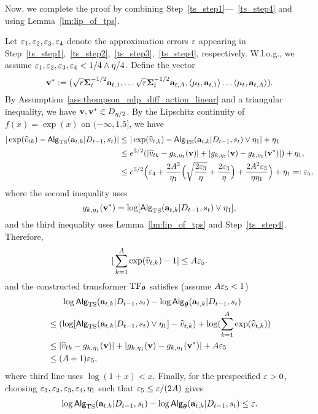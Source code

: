 Now, we complete the proof by combining Step~\ref{ts_step1}---~\ref{ts_step4} and using Lemma~\ref{lm:lip_of_tps}.


Let $\varepsilon_1,\varepsilon_2,\varepsilon_3,\varepsilon_4$ denote the approximation errors $\varepsilon$ appearing in Step~\ref{ts_step1},~\ref{ts_step2},~\ref{ts_step3},~\ref{ts_step4}, respectively. W.l.o.g., we assume $\varepsilon_1,\varepsilon_2,\varepsilon_3,\varepsilon_4<1/4\wedge {\eta}/4$. Define the vector $${\mathbf{v}}^*:=(\sqrt{{r}}{{{\mathbf\Sigma}}_t^{-1/2}{\mathbf a}_{t,1}},\ldots
        \sqrt{{r}}{{{\mathbf\Sigma}}_t^{-1/2}{\mathbf a}_{t,A}},
        \left\langle{{{\mathbf\mu}}_t},{\mathbf a}_{t,1}\right\rangle\ldots
        \left\langle{{{\mathbf\mu}}_t},{\mathbf a}_{t,A}\right\rangle).$$
By Assumption~\ref{ass:thompson_mlp_diff_action_linear} and a triangular inequality,  we have ${\mathbf{v}},{\mathbf{v}}^*\in{D}_{{\eta}/2}$. 
 By the Lipschitz continuity of $f(x)=\exp(x)$ on $(-\infty,1.5]$, we have
\begin{align*}
|\exp(\widehat v_{tk})- {\mathsf{Alg}}_{{\mathrm{TS}}}({\mathbf a}_{t,k}|{D}_{t-1},{s}_t)|&\leq|\exp(\widehat v_{t,k})- {\mathsf{Alg}}_{{\mathrm{TS}}}({\mathbf a}_{t,k}|{D}_{t-1},{s}_t)\vee{\eta_1}|+{\eta_1} \\
&
\leq e^{3/2}(|\widehat v_{tk}-g_{k,{\eta_1}}({\mathbf{v}})|+|g_{k,{\eta_1}}({\mathbf{v}})-g_{k,{\eta_1}}({\mathbf{v}}^*)|)+{\eta_1},\\
&\leq
e^{3/2}\Big(\varepsilon_4+\frac{2A^2}{{\eta_1}}\Big(\sqrt{\frac{2\varepsilon_3}{{\eta}}}+\frac{2\varepsilon_3}{{\eta}}\Big)+\frac{2A^2\varepsilon_3}{{\eta}{\eta_1}}\Big)+{\eta_1}=:\varepsilon_5,
\end{align*}
where the second inequality uses 
$$g_{k,{\eta_1}}({\mathbf{v}}^*)=\log[{\mathsf{Alg}}_{{\mathrm{TS}}}({\mathbf a}_{t,k}|{D}_{t-1},{s}_t)\vee{\eta_1}],$$ and the 
third inequality uses Lemma~\ref{lm:lip_of_tps} and Step~\ref{ts_step4}. Therefore, 
\begin{align*}
 |\sum_{k=1}^A \exp(\widehat v_{t,k})-1|\leq A\varepsilon_5.   
\end{align*}
and the constructed transformer ${\rm TF}_{{\boldsymbol \theta}}$ satisfies (assume $A\varepsilon_5<1$)
\begin{align*}
&\quad~~ \log{\mathsf{Alg}}_{{\mathrm{TS}}}({\mathbf a}_{t,k}|{D}_{t-1},{s}_t)-\log{\mathsf{Alg}}_{{{\boldsymbol \theta}}}({\mathbf a}_{t,k}|{D}_{t-1},{s}_t)\\
&\leq (\log[{\mathsf{Alg}}_{{\mathrm{TS}}}({\mathbf a}_{t,k}|{D}_{t-1},{s}_t)\vee{\eta_1}]-\widehat v_{t,k}
)+
\log(\sum_{k=1}^A\exp({\widehat v}_{t,k}))\\
&\leq
|\widehat v_{tk}-g_{k,{\eta_1}}({\mathbf{v}})|+|g_{k,{\eta_1}}({\mathbf{v}})-g_{k,{\eta_1}}({\mathbf{v}}^*)|+A\varepsilon_5
\\
&\leq (A+1)\varepsilon_5,
\end{align*}
where third line uses $\log(1+x)<x$.
Finally, for the prespecified $\varepsilon>0$,  choosing $\varepsilon_1,\varepsilon_2,\varepsilon_3,\varepsilon_4,{\eta_1}$ such that $\varepsilon_5\leq\varepsilon/(2A)$ gives 
\begin{align*}  
\log{\mathsf{Alg}}_{{\mathrm{TS}}}({\mathbf a}_{t,k}|{D}_{t-1},{s}_t)-\log{\mathsf{Alg}}_{{{\boldsymbol \theta}}}({\mathbf a}_{t,k}|{D}_{t-1},{s}_t)\leq\varepsilon.
\end{align*}

